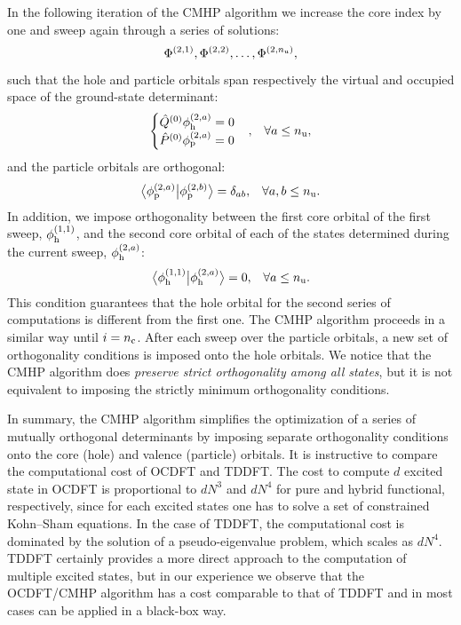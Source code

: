\documentclass[8.5pt,twoside,twocolumn]{article}
\newcommand{\braket}[3][0]
{\ifthenelse{\equal{#1}{0}}{\left\langle #2 \middle| #3 \right\rangle}
{\ifthenelse{\equal{#1}{1}}{\big\langle #2 \big| #3 \big\rangle}
{\ifthenelse{\equal{#1}{2}}{\Big\langle #2 \Big| #3 \Big\rangle}
{\ifthenelse{\equal{#1}{3}}{\bigg\langle #2 \bigg| #3 \bigg\rangle}
{\ifthenelse{\equal{#1}{4}}{\Bigg\langle #2 \Bigg| #3 \Bigg\rangle}
{Error}}}}}
}
\begin{document}
In the following iteration of the CMHP algorithm we increase the core index by one and sweep again through a series of solutions:
\begin{equation}
\Phi^{(2,1)}, \Phi^{(2,2)}, \ldots, \Phi^{(2,n_{\rm u})},
\end{equation}
such that the hole and particle orbitals span respectively the virtual and occupied space of the ground-state determinant:
\begin{align}
\begin{cases}
\hat{Q}^{(0)}\phi_{\rm h}^{(2,a)}= 0\\
\hat{P}^{(0)}\phi_{\rm p}^{(2,a)}= 0
\end{cases} &,&\forall a \leq n_{\rm u},
\end{align}
and the particle orbitals are orthogonal:
\begin{align}
\braket[1]{\phi^{(2,a)}_{\rm p}}{\phi^{(2,b)}_{\rm p}} &= \delta_{ab},&\forall a,b \leq n_{\rm u}.
\end{align}
In addition, we impose orthogonality between the first core orbital of the first sweep, $\phi^{(1,1)}_{\rm h}$, and the second core orbital of each of the states determined during the current sweep, $\phi^{(2,a)}_{\rm h}$:
\begin{align}
\braket[1]{\phi^{(1,1)}_{\rm h}}{\phi^{(2,a)}_{\rm h}} &=0,&\forall a \leq n_{\rm u}.
\end{align}
This condition guarantees that the hole orbital for the second series of computations is different from the first one.
The CMHP algorithm proceeds in a similar way until $i = n_{\rm c}$.  After each sweep over the particle orbitals, a new set of orthogonality conditions is imposed onto the hole orbitals.
We notice that the CMHP algorithm does \textit{preserve strict orthogonality among all states}, but it is not equivalent to imposing the strictly minimum orthogonality conditions.

In summary, the CMHP algorithm simplifies the optimization of a series of mutually orthogonal determinants by imposing separate orthogonality conditions onto the core (hole) and valence (particle) orbitals.
It is instructive to compare the computational cost of OCDFT and TDDFT.
The cost to compute $d$ excited state in OCDFT is proportional to $d N^3$ and $d N^4$ for pure and hybrid functional, respectively, since for each excited states one has to solve a set of constrained Kohn--Sham equations.
In the case of TDDFT, the computational cost is dominated by the solution of a pseudo-eigenvalue problem, which scales as $d N^4$.
TDDFT certainly provides a more direct approach to the computation of multiple excited states, but in our experience we observe that the OCDFT/CMHP algorithm has a cost comparable to that of TDDFT and in most cases can be applied in a black-box way.
\end{document}
